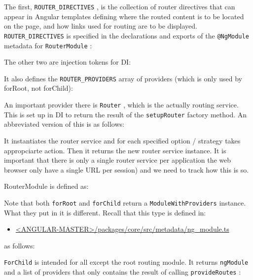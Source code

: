 The first,
\texttt{ROUTER\_DIRECTIVES}
, is the collection of router directives that can appear in
Angular templates defining where the routed content is to be located on the page, and
how links used for routing are to be displayed.
\texttt{ROUTER\_DIRECTIVES}
is specified in the
declarations and exports of the
\texttt{@NgModule}
metadata for
\texttt{RouterModule}
:



The other two are injection tokens for DI:



It also defines the
\texttt{ROUTER\_PROVIDERS}
array of providers (which is only used by
forRoot, not forChild):



An important provider there is
\texttt{Router}
, which is the actually routing service. This is set
up in DI to return the result of the
\texttt{setupRouter}
factory method. An abbreviated
version of this is as follows:



It instantiates the router service and for each specified option / strategy takes
appropciarte action. Then it returns the new router service instance. It is important
that there is only a single router service per application the web browser only have a
single URL per session) and we need to track how this is so.

RouterModule is defined as:



Note that both
\texttt{forRoot}
and
\texttt{forChild}
return a
\texttt{ModuleWithProviders}
instance. What
they put in it is different. Recall that this type is defined in:

\begin{itemize}
  \item \href{https://github.com/angular/angular/blob/master/packages/core/src/metadata/ng_module.ts}
        {<ANGULAR-MASTER>/packages/core/src/metadata/ng\_module.ts}
\end{itemize}

as follows:



\texttt{ForChild}
is intended for all except the root routing module. It returns
\texttt{ngModule}
and a
list of providers that only contains the result of calling
\texttt{provideRoutes}
:

